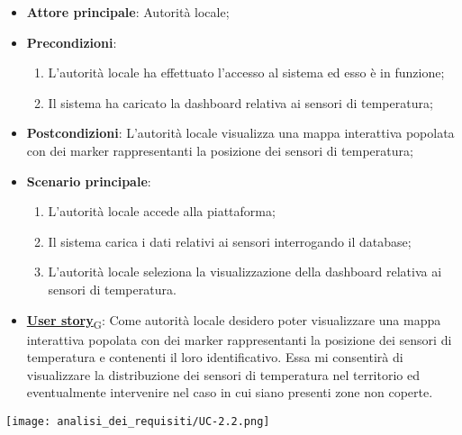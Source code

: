 \begin{itemize}
	\item \textbf{Attore principale}: Autorità locale;
	\item \textbf{Precondizioni}:
	      \begin{enumerate}
		      \item L'autorità locale ha effettuato l'accesso al sistema ed esso è in funzione;
		      \item Il sistema ha caricato la dashboard relativa ai sensori di temperatura;
	      \end{enumerate}
	\item \textbf{Postcondizioni}: L'autorità locale visualizza una mappa interattiva popolata con dei marker rappresentanti la posizione dei sensori di temperatura;
	\item \textbf{Scenario principale}:
	      \begin{enumerate}
		      \item L'autorità locale accede alla piattaforma;
		      \item Il sistema carica i dati relativi ai sensori interrogando il database;
		      \item L'autorità locale seleziona la visualizzazione della dashboard relativa ai sensori di temperatura.
	      \end{enumerate}
	\item \href{https://7last.github.io/docs/rtb/documentazione-interna/glossario\#user-story}{\textbf{User story}\textsubscript{G}}:
	      Come autorità locale desidero poter visualizzare una mappa interattiva popolata con dei marker rappresentanti la posizione dei sensori di temperatura e contenenti il loro identificativo. Essa mi consentirà di visualizzare la distribuzione dei sensori di temperatura nel territorio ed eventualmente intervenire nel caso in cui siano presenti zone non coperte.
\end{itemize}
\begin{center}
	\texttt{[image: analisi\_dei\_requisiti/UC-2.2.png]}
\end{center}

